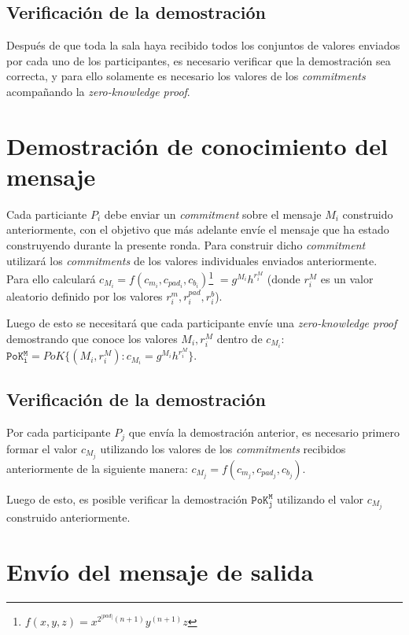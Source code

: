 \subsection{Verificación de la demostración}

Después de que toda la sala haya recibido todos los conjuntos de valores enviados 
por cada uno de los participantes, es necesario verificar que la demostración sea 
correcta, y para ello solamente es necesario los valores de los \emph{commitments} 
acompañando la \emph{zero-knowledge proof}.

\section{Demostración de conocimiento del mensaje}

Cada particiante $P_i$ debe enviar un \emph{commitment} sobre el mensaje $M_i$ 
construido anteriormente, con el objetivo que más adelante envíe el mensaje que 
ha estado construyendo durante la presente ronda. Para construir dicho \emph{commitment} 
utilizará los \emph{commitments} de los valores individuales enviados anteriormente. 
Para ello calculará 
$c_{M_i} = f(c_{m_i}, c_{pad_i}, c_{b_i})$\footnote{$f(x, y, z) = x^{2^{|pad|}(n+1)} y^{(n+1)} z$} 
$= g^{M_i} h^{r_i^{M}}$ (donde $r_i^{M}$ es un valor aleatorio definido por los 
valores $r_i^m, r_i^{pad}, r_i^b$). 

Luego de esto se necesitará que cada participante envíe una \emph{zero-knowledge proof} 
demostrando que conoce los valores $M_i, r_i^M$ dentro de $c_{M_i}$: 
$\mathtt{PoK_i^M} = PoK\{(M_i, r_i^M) : c_{M_i} = g^{M_i} h^{r_i^M}\}$.

\subsection{Verificación de la demostración}

Por cada participante $P_j$ que envía la demostración anterior, es necesario primero 
formar el valor $c_{M_j}$ utilizando los valores de los \emph{commitments} recibidos 
anteriormente de la siguiente manera: $c_{M_j} = f(c_{m_j}, c_{pad_j}, c_{b_j})$.

Luego de esto, es posible verificar la demostración $\mathtt{PoK_j^M}$ utilizando el 
valor $c_{M_j}$ construido anteriormente.

\section{Envío del mensaje de salida}

